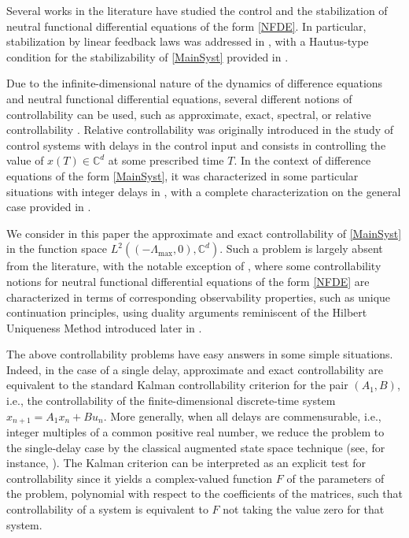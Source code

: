 \documentclass[10pt]{article}
\newcommand{\ie}{i.e.,\xspace}
\theoremstyle{plain}
\theoremstyle{definition}
\numberwithin{equation}{section}\numberwithin{figure}{section}\emergencystretch=3em
\begin{document}
Several works in the literature have studied the control and the stabilization of neutral functional differential equations of the form \eqref{NFDE}. In particular, stabilization by linear feedback laws was addressed in \cite{Pandolfi1976Stabilization, Hale2002Strong, OConnor1983Stabilization}, with a Hautus-type condition for the stabilizability of \eqref{MainSyst} provided in \cite{Hale2002Strong}.

Due to the infinite-dimensional nature of the dynamics of difference equations and neutral functional differential equations, several different notions of controllability can be used, such as approximate, exact, spectral, or relative controllability \cite{Salamon1984Control, Chyung1970Controllability, Diblik2008Controllability, Pospisil2015Relative, Mazanti2017Relative}. Relative controllability was originally introduced in the study of control systems with delays in the control input \cite{Chyung1970Controllability} and consists in controlling the value of $x(T) \in \mathbb C^d$ at some prescribed time $T$. In the context of difference equations of the form \eqref{MainSyst}, it was characterized in some particular situations with integer delays in \cite{Diblik2008Controllability, Pospisil2015Relative}, with a complete characterization on the general case provided in \cite{Mazanti2017Relative}.

We consider in this paper the approximate and exact controllability of \eqref{MainSyst} in the function space $L^2((-\Lambda_{\max}, 0), \mathbb C^d)$. Such a problem is largely absent from the literature, with the notable exception of \cite{Salamon1984Control, OConnor1983Function}, where some controllability notions for neutral functional differential equations of the form \eqref{NFDE} are characterized in terms of corresponding observability properties, such as unique continuation principles, using duality arguments reminiscent of the Hilbert Uniqueness Method introduced later in \cite{Lions1986Controlabilite, Lions1988Exact}.

The above controllability problems have easy answers in some simple situations. \hbox{Indeed}, in the case of a single delay, approximate and exact controllability are equivalent to the standard Kalman controllability criterion for the pair $(A_1, B)$, \ie the controllability of the finite-dimensional discrete-time system $x_{n+1} = A_1 x_n + B u_n$. More generally, when all delays are commensurable, \ie integer multiples of a common positive real number, we reduce the problem to the single-delay case by the classical augmented state space technique (see, for instance, \cite[Chap.\,4]{Franklin1997Digital}). The Kalman criterion can be interpreted as an explicit test for controllability since it yields a complex-valued function $F$ of the parameters of the problem, polynomial with respect to the coefficients of the matrices, such that controllability of a system is equivalent to $F$ not taking the value zero for that system.
\end{document}
